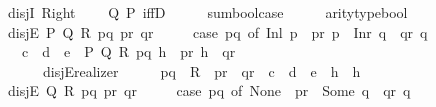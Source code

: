 \begin{isabellebody}
\isanewline
\ \ disjI{}{\isacharcolon}{\kern0pt}\ {\isachardoublequoteopen}Right{\isachardoublequoteclose}\isanewline
\ \ \ \ {\isachardoublequoteopen}\isactrlbold {\isasymlambda}Q\ P{\isachardot}{\kern0pt}\ iffD{}\ {\isasymcdot}\ {\isacharunderscore}{\kern0pt}\ {\isasymcdot}\ {\isacharunderscore}{\kern0pt}\ {\isasymbullet}\ {\isacharparenleft}{\kern0pt}sumbool{\isachardot}{\kern0pt}case{\isacharunderscore}{\kern0pt}{}\ {\isasymcdot}\ {\isacharunderscore}{\kern0pt}\ {\isasymcdot}\ {\isacharunderscore}{\kern0pt}\ {\isasymbullet}\ arity{\isacharunderscore}{\kern0pt}type{\isacharunderscore}{\kern0pt}bool{\isacharparenright}{\kern0pt}{\isachardoublequoteclose}\isanewline
\isanewline
\ \ disjE\ {\isacharparenleft}{\kern0pt}P{\isacharcomma}{\kern0pt}\ Q{\isacharcomma}{\kern0pt}\ R{\isacharparenright}{\kern0pt}{\isacharcolon}{\kern0pt}\ {\isachardoublequoteopen}{\isasymlambda}pq\ pr\ qr{\isachardot}{\kern0pt}\isanewline
\ \ \ \ \ {\isacharparenleft}{\kern0pt}case\ pq\ of\ Inl\ p\ {\isasymRightarrow}\ pr\ p\ {\isacharbar}{\kern0pt}\ Inr\ q\ {\isasymRightarrow}\ qr\ q{\isacharparenright}{\kern0pt}{\isachardoublequoteclose}\isanewline
\ \ \ \ {\isachardoublequoteopen}\isactrlbold {\isasymlambda}{\isacharparenleft}{\kern0pt}c{\isacharcolon}{\kern0pt}\ {\isacharunderscore}{\kern0pt}{\isacharparenright}{\kern0pt}\ {\isacharparenleft}{\kern0pt}d{\isacharcolon}{\kern0pt}\ {\isacharunderscore}{\kern0pt}{\isacharparenright}{\kern0pt}\ {\isacharparenleft}{\kern0pt}e{\isacharcolon}{\kern0pt}\ {\isacharunderscore}{\kern0pt}{\isacharparenright}{\kern0pt}\ P\ Q\ R\ pq\ {\isacharparenleft}{\kern0pt}h{}{\isacharcolon}{\kern0pt}\ {\isacharunderscore}{\kern0pt}{\isacharparenright}{\kern0pt}\ pr\ {\isacharparenleft}{\kern0pt}h{}{\isacharcolon}{\kern0pt}\ {\isacharunderscore}{\kern0pt}{\isacharparenright}{\kern0pt}\ qr{\isachardot}{\kern0pt}\isanewline
\ \ \ \ \ \ \ disjE{\isacharunderscore}{\kern0pt}realizer\ {\isasymcdot}\ {\isacharunderscore}{\kern0pt}\ {\isasymcdot}\ {\isacharunderscore}{\kern0pt}\ {\isasymcdot}\ pq\ {\isasymcdot}\ R\ {\isasymcdot}\ pr\ {\isasymcdot}\ qr\ {\isasymbullet}\ c\ {\isasymbullet}\ d\ {\isasymbullet}\ e\ {\isasymbullet}\ h{}\ {\isasymbullet}\ h{}{\isachardoublequoteclose}\isanewline
\isanewline
\ \ disjE\ {\isacharparenleft}{\kern0pt}Q{\isacharcomma}{\kern0pt}\ R{\isacharparenright}{\kern0pt}{\isacharcolon}{\kern0pt}\ {\isachardoublequoteopen}{\isasymlambda}pq\ pr\ qr{\isachardot}{\kern0pt}\isanewline
\ \ \ \ \ {\isacharparenleft}{\kern0pt}case\ pq\ of\ None\ {\isasymRightarrow}\ pr\ {\isacharbar}{\kern0pt}\ Some\ q\ {\isasymRightarrow}\ qr\ q{\isacharparenright}{\kern0pt}{\isachardoublequoteclose}\isanewline

\end{isabellebody}
